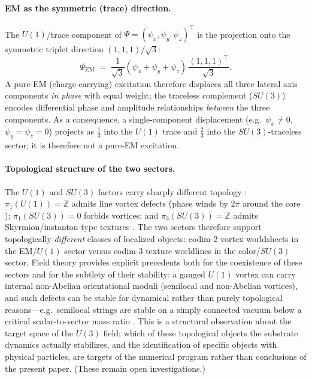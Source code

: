 \paragraph{EM as the symmetric (trace) direction.}
The $U(1)$/trace component of $\Psi=(\psi_x,\psi_y,\psi_z)^\top$ is the projection onto the
symmetric triplet direction $(1,1,1)/\sqrt{3}$:
\begin{equation}
  \Psi_{\mathrm{EM}} \;=\; \frac{1}{\sqrt{3}}(\psi_x+\psi_y+\psi_z)\,\frac{(1,1,1)^\top}{\sqrt{3}}.
  \label{eq:em-trace}
\end{equation}
A pure-EM (charge-carrying) excitation therefore displaces all three lateral axis components
\emph{in phase} with equal weight; the traceless complement ($SU(3)$) encodes differential
phase and amplitude relationships \emph{between} the three components.
As a consequence, a single-component displacement (e.g.\ $\psi_x\neq0$, $\psi_y=\psi_z=0$)
projects as $\tfrac{1}{3}$ into the $U(1)$ trace and $\tfrac{2}{3}$ into the $SU(3)$-traceless
sector; it is therefore not a pure-EM excitation.

\paragraph{Topological structure of the two sectors.}
The $U(1)$ and $SU(3)$ factors carry sharply different topology
\citep{Kibble1976Topology,VilenkinShellard1994,MantonSutcliffe2004}:
$\pi_1(U(1))=\mathbb{Z}$ admits line vortex defects (phase winds by $2\pi$ around the core
\citep{NielsenOlesen1973,HindmarshKibble1995CosmicStrings});
$\pi_1(SU(3))=0$ forbids vortices; and $\pi_3(SU(3))=\mathbb{Z}$ admits Skyrmion/instanton-type textures
\citep{Skyrme1962,AtiyahManton1989}.
The two sectors therefore support topologically \emph{different} classes of
localized objects: codim-2 vortex worldsheets in the EM/$U(1)$ sector versus codim-3 texture
worldlines in the color/$SU(3)$ sector.
Field theory provides explicit precedents both for the coexistence of these sectors and for the subtlety of
their stability: a gauged $U(1)$ vortex can carry internal non-Abelian orientational moduli (semilocal and
non-Abelian vortices), and such defects can be stable for dynamical rather than purely topological reasons---e.g.\
semilocal strings are stable on a simply connected vacuum below a critical scalar-to-vector mass ratio
\citep{VachaspatiAchucarro1991Semilocal,AchucarroVachaspati2000,AuzziBolognesiEvslinKonishiYung2003,Eto2021OrientationalModuli}.
This is a structural observation about the target space of the $U(3)$ field; which of these
topological objects the substrate dynamics actually stabilizes, and the identification of specific
objects with physical particles, are targets of the numerical program rather than conclusions of
the present paper.
(These remain open investigations.)

